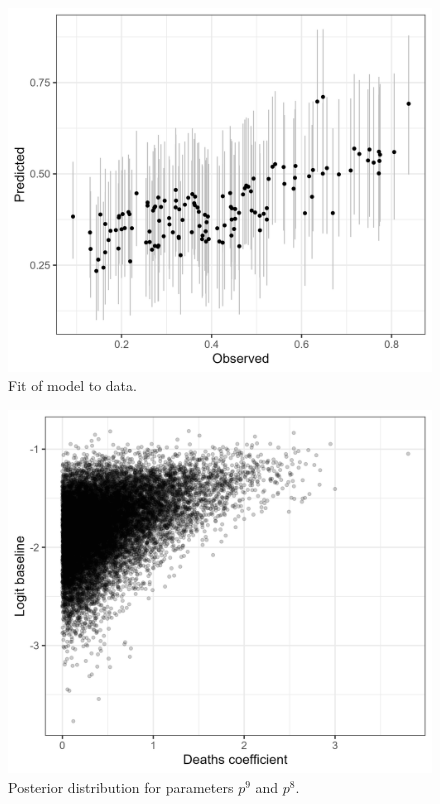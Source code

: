 \documentclass[
]{article}
\begin{document}
\begin{figure}
\includegraphics[width=29.11in]{README_files/figure-gfm/mobilityfitted} \caption{Fit of model to data.}\label{fig:mobilityfitted}
\end{figure}

\begin{figure}
\includegraphics[width=29.11in]{README_files/figure-gfm/mobilityposterior} \caption{Posterior distribution for parameters $p^9$ and $p^8$.}\label{fig:mobilityposterior}
\end{figure}
\end{document}
